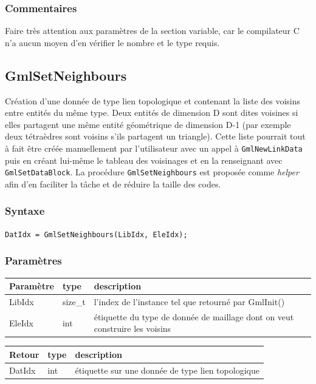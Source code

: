\documentclass[a4paper,12pt]{article}
\begin{document}
\subsubsection*{Commentaires}
Faire très attention aux paramètres de la section variable, car le compilateur C n'a aucun moyen d'en vérifier le nombre et le type requis.


\subsection{GmlSetNeighbours}

Création d'une donnée de type lien topologique et contenant la liste des voisins entre entités du même type.
Deux entités de dimension D sont dites voisines si elles partagent une même entité géométrique de dimension D-1 (par exemple deux tétraèdres sont voisins s'ils partagent un triangle).
Cette liste pourrait tout à fait être créée manuellement par l'utilisateur avec un appel à {\tt GmlNewLinkData} puis en créant lui-même le tableau des voisinages et en la renseignant avec {\tt GmlSetDataBlock}.
La procédure {\tt GmlSetNeighbours} est proposée comme \emph{helper} afin d'en faciliter la tâche et de réduire la taille des codes.

\subsubsection*{Syntaxe}

{\tt DatIdx = GmlSetNeighbours(LibIdx, EleIdx);}

\subsubsection*{Paramètres}

\begin{tabular}{|m{2cm}|m{1.5cm}|m{10.5cm}|}
\hline
Paramètre  & type    & description \\
\hline
LibIdx     & size\_t & l'index de l'instance tel que retourné par GmlInit() \\
\hline
EleIdx     & int     & étiquette du type de donnée de maillage dont on veut construire les voisins \\
\hline
\end{tabular}

\medskip

\begin{tabular}{|m{2cm}|m{1.5cm}|m{10.5cm}|}
\hline
Retour     & type   & description \\
\hline
DatIdx     & int    & étiquette sur une donnée de type lien topologique \\
\hline
\end{tabular}
\end{document}
